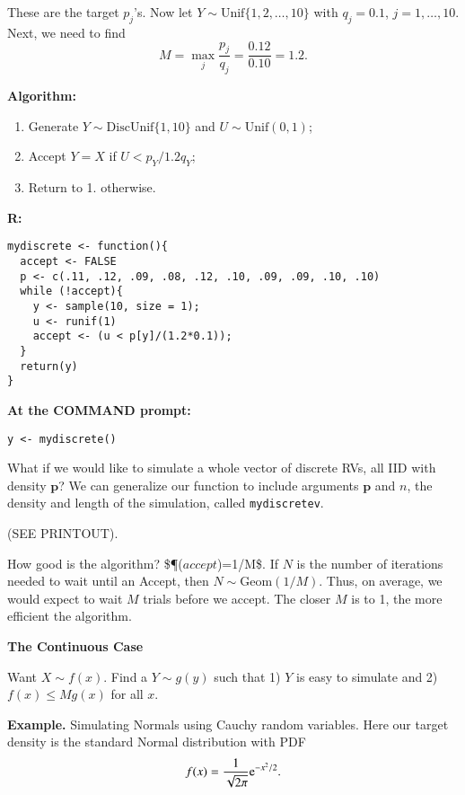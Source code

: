 \documentclass[captions=tableheading]{scrbook}
\begin{document}
These are the target $p_{j}$'s. Now let $Y\sim\mathrm{Unif}\{1,2,\ldots,10\}$ with $q_{j}=0.1$, $j=1,\ldots,10$. Next, we need to find 
\[ 
M=\max_{j}\frac{p_{j}}{q_{j}}=\frac{0.12}{0.10}=1.2.
\]

\textbf{Algorithm:}

\begin{enumerate}
\item Generate $Y \sim \mathrm{DiscUnif}\{1,10\}$ and $U\sim\mathrm{Unif}(0,1)$;
\item Accept $Y = X$ if $U < p_{Y}/1.2 q_{Y}$;
\item Return to 1. otherwise.
\end{enumerate}
 
\textbf{R:}
\begin{verbatim}
mydiscrete <- function(){
  accept <- FALSE
  p <- c(.11, .12, .09, .08, .12, .10, .09, .09, .10, .10)
  while (!accept){
    y <- sample(10, size = 1);
    u <- runif(1)
    accept <- (u < p[y]/(1.2*0.1));
  }
  return(y)
}
\end{verbatim}


\textbf{At the COMMAND prompt:}
\begin{verbatim}
y <- mydiscrete()
\end{verbatim}



What if we would like to simulate a whole vector of discrete RVs, all IID with density $\mathbf{p}$? We can generalize our function to include arguments $\mathbf{p}$ and $n$, the density and length of the simulation, called \texttt{mydiscretev}.

 

(SEE PRINTOUT).

 How good is the algorithm? \$\P($accept$)=1/M\$. If $N$ is the number of iterations needed to wait until an Accept, then $N\sim\mathrm{Geom}(1/M)$. Thus, on average, we would expect to wait $M$ trials before we accept. The closer $M$ is to 1, the more efficient the algorithm.

\textbf{The Continuous Case}

Want $X\sim f(x)$. Find a $Y\sim g(y)$ such that 1) $Y$ is easy to simulate and 2) $f(x)\leq Mg(x)$ for all $x$.

\textbf{Example.} Simulating Normals using Cauchy random variables.
Here our target density is the standard Normal distribution with PDF
\[
f(x) = \frac{1}{\sqrt{2\pi}} \mathrm{e}^{-x^{2}/2}.
\]
\end{document}
